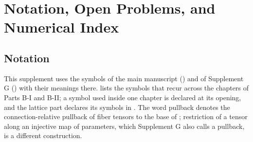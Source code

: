 \chapter{Notation, Open Problems, and Numerical Index}
\label{app:base-backmatter}

\section{Notation}

This supplement uses the symbols of the main manuscript () and of Supplement G
() with their meanings there.  lists the symbols
that recur across the chapters of Parts B-I and B-II; a symbol used inside one chapter is declared at
its opening, and the lattice part declares its symbols in . The word
pullback denotes the connection-relative pullback of fiber tensors to the base of
; restriction of a tensor along an injective map of parameters,
which Supplement G also calls a pullback, is a different construction.

